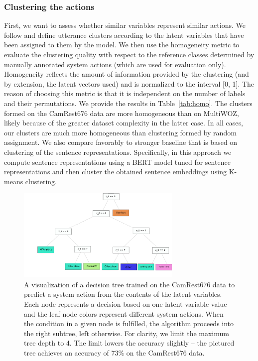 \subsubsection{Clustering the actions}
\label{sec:clustering}
First, we want to assess whether similar variables represent similar actions.
We follow \citet{zhao2018unsupervised} and define utterance clusters according to the latent variables that have been assigned to them by the model.
We then use the homogeneity metric \cite{rosenberg-hirschberg-2007-v} to evaluate the clustering quality with respect to the reference classes determined by manually annotated system actions (which are used for evaluation only).
Homogeneity reflects the amount of information provided by the clustering (and by extension, the latent vectors used) and is normalized to the interval [0, 1].
The reason of choosing this metric is that it is independent on the number of labels and their permutations.
We provide the results in Table~\ref{tab:homo}.
The clusters formed on the CamRest676 data are more homogeneous than on MultiWOZ, likely because of the greater dataset complexity in the latter case. 
In all cases, our clusters are much more homogeneous than clustering formed by random assignment.
We also compare favorably to stronger baseline that is based on clustering of the sentence representations.
Specifically, in this approach we compute sentence representations using a BERT model tuned for sentence representations \cite{reimers-2019-sentence-bert} and then cluster the obtained sentence embeddings using K-means clustering.

\begin{figure}[t]
    \centering
    \includegraphics[width=0.70\textwidth]{images/dt2.pdf}
    \vspace{-5mm}
    \caption{A visualization of a decision tree trained on the CamRest676 data to predict a system action from the contents of the latent variables. Each node represents a decision based on one latent variable value and the leaf node colors represent different system actions. When the condition in a given node is fulfilled, the algorithm proceeds into the right subtree, left otherwise. For clarity, we limit the maximum tree depth to 4. The limit lowers the accuracy slightly -- the pictured tree achieves an accuracy of 73\% on the CamRest676 data.}
    \label{fig:dt}
\end{figure}

